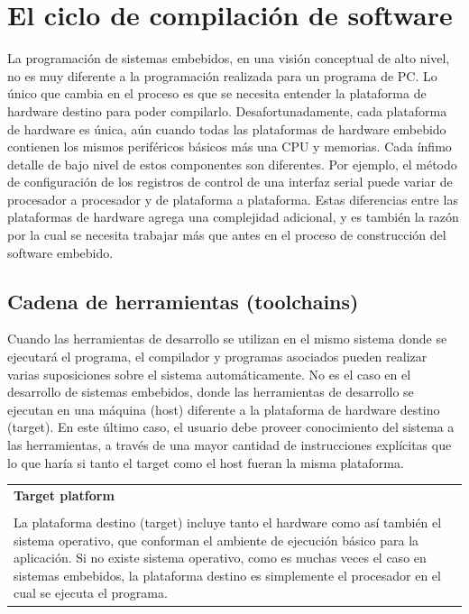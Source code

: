 \documentclass[output=paper, 
colorlinks,
citecolor=brown,
newtxmath
]{langscibook}
\begin{document}

\section {El ciclo de compilación de software}

La programación de sistemas embebidos, en una visión conceptual de alto nivel, 
no es muy diferente a la programación realizada para un programa de PC. Lo único que 
cambia en el proceso es 
que se necesita entender la plataforma de hardware destino para poder compilarlo. 
Desafortunadamente, cada plataforma de hardware es única, aún cuando
todas las plataformas de hardware embebido contienen los mismos periféricos
básicos más una CPU y memorias. Cada ínfimo detalle de bajo nivel de estos 
componentes son diferentes. Por ejemplo, el método de configuración
de los registros de control
de una interfaz serial puede variar de procesador a procesador 
y de plataforma a plataforma.
Estas diferencias entre las plataformas de hardware
agrega una complejidad adicional, y es también la razón
por la cual se necesita trabajar más que antes en el proceso 
de construcción del software embebido.

\subsection {Cadena de herramientas (toolchains)}

Cuando las herramientas de desarrollo se utilizan en el mismo sistema 
donde se ejecutará el programa, el compilador y programas asociados
pueden realizar varias suposiciones sobre el sistema automáticamente.
No es el caso en el desarrollo de sistemas embebidos, donde las herramientas
de desarrollo se ejecutan en una máquina (host) diferente a la plataforma
de hardware destino (target). En este último caso, el usuario debe proveer 
conocimiento del sistema a las herramientas, a través 
de una mayor cantidad de instrucciones explícitas que lo que haría
si tanto el target como el host fueran la misma plataforma.

 
\begin{center}
\begin{tabularx}{0.95\textwidth}{|X|}
\hline
\rowcolor{aliceblue}
\textbf{Target platform}\\ \\
La plataforma destino (target) incluye tanto el hardware como así
también el sistema operativo, que conforman el ambiente de ejecución
básico para la aplicación. Si no existe sistema operativo, como es
muchas veces el caso en sistemas embebidos, la plataforma destino
es simplemente el procesador en el cual se ejecuta el  programa.\\
\hline
\end{tabularx}
\end{center}
\end{document}
